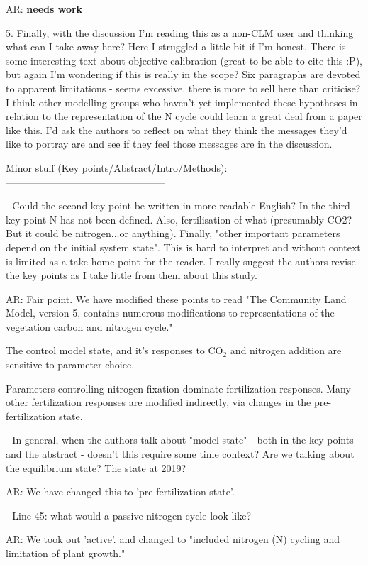 \documentclass{article}
\begin{document}
\textsf{AR:  \textbf{needs work}} 

5. Finally, with the discussion I'm reading this as a non-CLM user and thinking what can I take away here? Here I struggled a little bit if I'm honest. There is some interesting text about objective calibration (great to be able to cite this :P), but again I'm wondering if this is really in the scope? Six paragraphs are devoted to apparent limitations - seems excessive, there is more to sell here than criticise? I think other modelling groups who haven't yet implemented these hypotheses in relation to the representation of the N cycle could learn a great deal from a paper like this. I'd ask the authors to reflect on what they think the messages they'd like to portray are and see if they feel those messages are in the discussion. 

Minor stuff (Key points/Abstract/Intro/Methods): 
------------------------------------------------ 

- Could the second key point be written in more readable English? In the third key point N has not been defined. Also, fertilisation of what (presumably CO2? But it could be nitrogen...or anything). Finally, "other important parameters depend on the initial system state". This is hard to interpret and without context is limited as a take home point for the reader. I really suggest the authors revise the key points as I take little from them about this study. 

\textsf{AR: Fair point. We have modified these points to read 
"The Community Land Model, version 5, contains numerous modifications to representations of the vegetation carbon and nitrogen cycle."}

\textsf{The control model state, and it's responses to CO$_{2}$ and nitrogen addition are sensitive to parameter choice.}

\textsf{Parameters controlling nitrogen fixation dominate fertilization responses. Many other fertilization responses are modified indirectly, via changes in the pre-fertilization state.}


- In general, when the authors talk about "model state" - both in the key points and the abstract - doesn't this require some time context? Are we talking about the equilibrium state? The state at 2019? 

\textsf{AR: We have changed this to 'pre-fertilization state'. }

- Line 45: what would a passive nitrogen cycle look like? 

\textsf{AR:  We took out 'active'. and changed to "included nitrogen (N) cycling and limitation of plant growth."}
\end{document}
